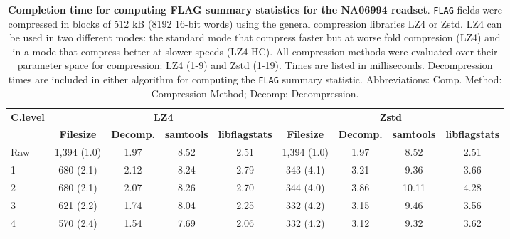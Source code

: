 \begin{table}[]
\centering
\caption{\textbf{Completion time for computing FLAG summary statistics for the NA06994 readset}. \texttt{FLAG}
fields were compressed in blocks of 512 kB (8192 16-bit words) using the general
compression libraries LZ4 or Zstd. LZ4 can be used in two different modes: the
standard mode that compress faster but at worse fold compresion (LZ4) and in a
mode that compress better at slower speeds (LZ4-HC). All compression methods
were evaluated over their parameter space for compression: LZ4 (1-9) and Zstd
(1-19). Times are listed in milliseconds. Decompression times are included in
either algorithm for computing the \texttt{FLAG} summary statistic. Abbreviations: Comp. Method:
Compression Method; Decomp: Decompression.}
\label{tab:NA06994-perf}
\begin{tabular}{|l|c|c|c|c|c|c|c|c|}
\hline
\multirow{2}{*}{\textbf{C.level}} & \multicolumn{4}{c|}{\textbf{LZ4}}                                                   & \multicolumn{4}{c|}{\textbf{Zstd}}                                                  \\ \cline{2-9} 
                                      & \textbf{Filesize} & \textbf{Decomp.} & \textbf{samtools} & \textbf{libflagstats} & \textbf{Filesize} & \textbf{Decomp.} & \textbf{samtools} & \textbf{libflagstats} \\ \hline
Raw                                   & 1,394 (1.0)       & 1.97                & 8.52              & 2.51                  & 1,394 (1.0)       & 1.97                & 8.52              & 2.51                  \\ \hline
1                                     & 680 (2.1)         & 2.12                & 8.24              & 2.79                  & 343 (4.1)         & 3.21                & 9.36              & 3.66                  \\ \hline
2                                     & 680 (2.1)         & 2.07                & 8.26              & 2.70                  & 344 (4.0)         & 3.86                & 10.11             & 4.28                  \\ \hline
3                                     & 621 (2.2)         & 1.74                & 8.04              & 2.25                  & 332 (4.2)         & 3.15                & 9.46              & 3.56                  \\ \hline
4                                     & 570 (2.4)         & 1.54                & 7.69              & 2.06                  & 332 (4.2)         & 3.12                & 9.32              & 3.62                  \\ \hline

\end{tabular}
\end{table}
